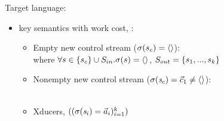 \documentclass{beamer}
\begin{document}
\begin{frame}{Target language: {\fmsvcode}}
\begin{itemize}
	\item key semantics with work cost,  : \\[1ex]
	\begin{itemize}
		\item<1-> Empty new control stream ($\sigma(s_c) = \langle \rangle$):
		\\[2ex]
		where $\forall s \in \{s_c\} \cup S_{in}. \sigma(s) = \langle \rangle$, $S_{out} = \{s_1,...,s_k\}$ 
		
		\item<2-> Nonempty new control stream ($\sigma(\mathit{s}_c)= \vec c_1 \ne \langle \rangle$):\\[2ex]
		\\[2ex]
	
	\item<3->  Xducers, $((\sigma(\mathit{s}_i) = \vec a_i)^k_{i=1})$ \\
	\end{itemize}		

\end{itemize}
\end{frame}
\end{document}
